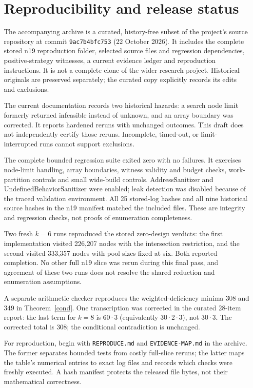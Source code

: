 \documentclass[11pt]{article}
\begin{document}
\section{Reproducibility and release status}
The accompanying archive is a curated, history-free subset of the project's source repository at commit \texttt{9ac7b4bfc753} (22 October 2026). It includes the complete stored n19 reproduction folder, selected source files and regression dependencies, positive-strategy witnesses, a current evidence ledger and reproduction instructions. It is not a complete clone of the wider research project. Historical originals are preserved separately; the curated copy explicitly records its edits and exclusions.

The current documentation records two historical hazards: a search node limit formerly returned infeasible instead of unknown, and an array boundary was corrected. It reports hardened reruns with unchanged outcomes. This draft does not independently certify those reruns. Incomplete, timed-out, or limit-interrupted runs cannot support exclusions.

The complete bounded regression suite exited zero with no failures. It exercises node-limit handling, array boundaries, witness validity and budget checks, work-partition controls and small wide-build controls. AddressSanitizer and UndefinedBehaviorSanitizer were enabled; leak detection was disabled because of the traced validation environment. All 25 stored-log hashes and all nine historical source hashes in the n19 manifest matched the included files. These are integrity and regression checks, not proofs of enumeration completeness.

Two fresh $k=6$ runs reproduced the stored zero-design verdicts: the first implementation visited 226,207 nodes with the intersection restriction, and the second visited 333,357 nodes with pool sizes fixed at six. Both reported completion. No other full n19 slice was rerun during this final pass, and agreement of these two runs does not resolve the shared reduction and enumeration assumptions.

A separate arithmetic checker reproduces the weighted-deficiency minima 308 and 349 in Theorem~\ref{cond}. One transcription was corrected in the curated 28-item report: the last term for $k=8$ is $60\cdot3$ (equivalently $30\cdot2\cdot3$), not $30\cdot3$. The corrected total is 308; the conditional contradiction is unchanged.

For reproduction, begin with \texttt{REPRODUCE.md} and \texttt{EVIDENCE-MAP.md} in the archive. The former separates bounded tests from costly full-slice reruns; the latter maps the table's numerical entries to exact log files and records which checks were freshly executed. A hash manifest protects the released file bytes, not their mathematical correctness.
\end{document}
